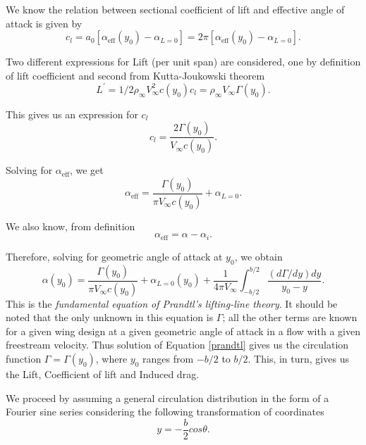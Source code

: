\documentclass[letterpaper,12pt]{article}
\begin{document}
We know the relation between sectional coefficient of lift and effective angle of attack is given by
\begin{equation}
c_l = a_0[\alpha_{\text{eff}}(y_0)-\alpha_{L=0}] = 2\pi[\alpha_{\text{eff}}(y_0)-\alpha_{L=0}].
\end{equation}

Two different expressions for Lift (per unit span) are considered, one by definition of lift coefficient and second from Kutta-Joukowski theorem
\begin{equation}
L^{'} = 1/2\rho_\infty V_\infty^2c(y_0)c_l = \rho_\infty V_\infty\Gamma(y_0).
\end{equation}

This gives us an expression for $c_l$
\begin{equation}
c_l = \frac{2\Gamma(y_0)}{V_\infty c(y_0)}.
\end{equation}

Solving for $\alpha_{\text{eff}}$, we get
\begin{equation}
\alpha_{\text{eff}} = \frac{\Gamma(y_0)}{\pi V_\infty c(y_0)}+\alpha_{L=0}.
\end{equation}

We also know, from definition
\begin{equation}
\alpha_{\text{eff}} = \alpha-\alpha_i.
\end{equation}

Therefore, solving for geometric angle of attack at $y_0$, we obtain
\begin{equation}
\boxed{
\alpha(y_0) = \frac{\Gamma(y_0)}{\pi V_\infty c(y_0)}+\alpha_{L=0}(y_0)+\frac{1}{4\pi V_\infty}\int_{-b/2}^{b/2}\frac{(d\Gamma/dy)dy}{y_0-y}.
}
\label{prandtl}
\end{equation}
This is the \textit{fundamental equation of Prandtl's lifting-line theory}. It should be noted that the only unknown in this equation is $\Gamma$; all the other terms are known for a given wing design at a given geometric angle of attack in a flow with a given freestream velocity. Thus solution of Equation \ref{prandtl} gives us the circulation function $\Gamma = \Gamma(y_0)$, where $y_0$ ranges from $-b/2$ to $b/2$. This, in turn, gives us the Lift, Coefficient of lift and Induced drag.

We proceed by assuming a general circulation distribution in the form of a Fourier sine series considering the following transformation of coordinates
\begin{equation}
y = -\frac{b}{2}cos\theta.
\end{equation}
\end{document}
